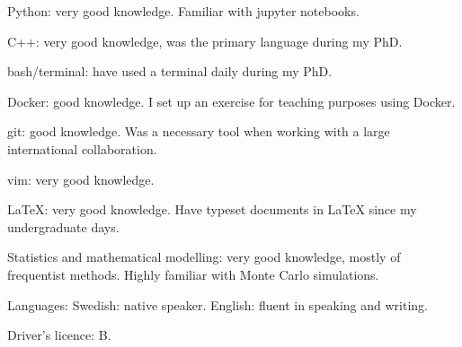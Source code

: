 



\begin{cvskills}


\cvskill
{Python:}
{very good knowledge. Familiar with jupyter notebooks.}

\cvskill
{C++:}
{very good knowledge, was the primary language during my PhD.}

\cvskill
{bash/terminal:}
{have used a terminal daily during my PhD.}

\cvskill
{Docker:} 
{good knowledge. I set up an exercise for teaching purposes using Docker.}

\cvskill
{git:}
{good knowledge. Was a necessary tool when working with a large international collaboration.}

\cvskill
{vim:}
{very good knowledge.}

\cvskill
{LaTeX:}
{very good knowledge. Have typeset documents in LaTeX since my undergraduate days.}

\cvskill
{Statistics and} {}
\cvskill
{mathematical modelling:}
{very good knowledge, mostly of frequentist methods. Highly familiar with Monte Carlo simulations.}

\cvskill
{Languages:}
{Swedish: native speaker. English: fluent in speaking and writing.}

\cvskill
{Driver's licence:}
{B.}


\end{cvskills}